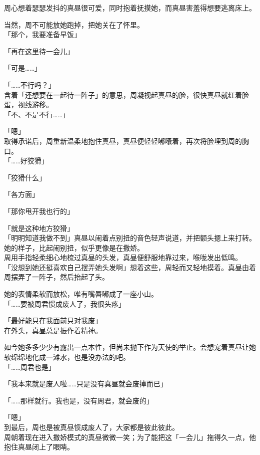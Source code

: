 周心想着瑟瑟发抖的真昼很可爱，同时抱着抚摸她，而真昼害羞得想要逃离床上。

当然，周不可能放她跑掉，把她关在了怀里。\\

「那个，我要准备早饭」

「再在这里待一会儿」

「可是……」

「……不行吗？」\\

含着「还想要在一起待一阵子」的意思，周凝视起真昼的脸，很快真昼就红着脸蛋，视线游移。\\

「不、不是不行……」

「嗯」\\

取得承诺后，周重新温柔地抱住真昼，真昼便轻轻嘟囔着，再次将脸埋到周的胸口。\\

「……好狡猾」

「狡猾什么」

「各方面」

「那你甩开我也行的」

「就是这种地方狡猾」\\

「明明知道我做不到」真昼以闹着点别扭的音色轻声说道，并把额头摁上来打转。她的样子，比起闹别扭，似乎更像是在撒娇。\\

周用手指轻柔细心地梳过真昼的头发，真昼便舒服地靠过来，喉咙发出低鸣。\\

「没想到她还挺喜欢自己摆弄她头发啊」想着这些，周轻而又轻地摸着。真昼由着周摆弄了一阵子，然后抬起了头。

她的表情柔软而放松，唯有嘴唇嘟成了一座小山。\\

「……要被周君惯成废人了，我很头疼」

「最好能只在我面前只对我废」\\

在外头，真昼总是振作着精神。

如今她多多少少有露出一点本性，但尚未抛下作为天使的举止。会想宠着真昼让她软绵绵地化成一滩水，也是没办法的吧。\\

「……周君也是」

「我本来就是废人啦……只是没有真昼就会废掉而已」

「……那样就行。我也是，没有周君，就会废的」

「嗯」\\

到最后，周也是被真昼惯成废人了，大家都是彼此彼此。\\

周朝着现在进入撒娇模式的真昼微微一笑；为了能把这「一会儿」拖得久一点，他抱住真昼闭上了眼睛。
